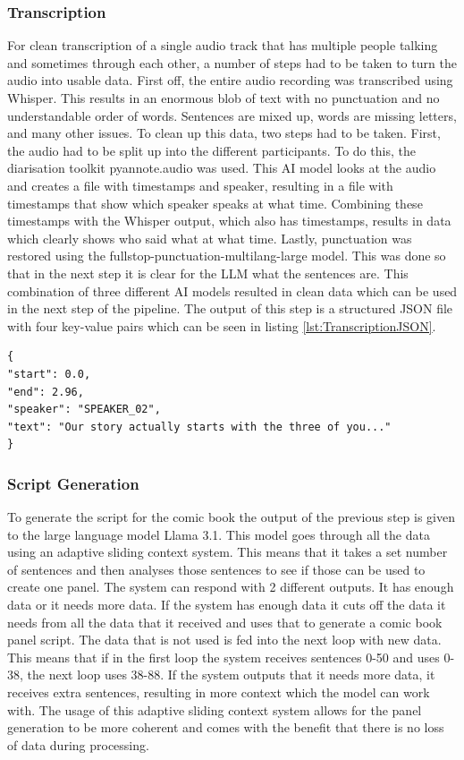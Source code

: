 \subsubsection*{Transcription}
For clean transcription of a single audio track that has multiple people talking and sometimes through each other, a number of steps had to be taken to turn the audio into usable data. First off, the entire audio recording was transcribed using Whisper. This results in an enormous blob of text with no punctuation and no understandable order of words. Sentences are mixed up, words are missing letters, and many other issues. To clean up this data, two steps had to be taken. First, the audio had to be split up into the different participants. To do this, the diarisation toolkit pyannote.audio was used. This AI model looks at the audio and creates a file with timestamps and speaker, resulting in a file with timestamps that show which speaker speaks at what time. Combining these timestamps with the Whisper output, which also has timestamps, results in data which clearly shows who said what at what time. Lastly, punctuation was restored using the fullstop-punctuation-multilang-large model. This was done so that in the next step it is clear for the LLM what the sentences are. This combination of three different AI models resulted in clean data which can be used in the next step of the pipeline. The output of this step is a structured JSON file with four key-value pairs which can be seen in listing \ref{lst:TranscriptionJSON}.

\begin{lstlisting}[style=jsonstyle, caption={Prompt for Comic Book Script Generation}, label={lst:TranscriptionJSON}]
{
"start": 0.0,
"end": 2.96,
"speaker": "SPEAKER_02",
"text": "Our story actually starts with the three of you..."
}
\end{lstlisting}
\subsubsection*{Script Generation}
To generate the script for the comic book the output of the previous step is given to the large language model Llama 3.1. This model goes through all the data using an adaptive sliding context system. This means that it takes a set number of sentences and then analyses those sentences to see if those can be used to create one panel. The system can respond with 2 different outputs. It has enough data or it needs more data. If the system has enough data it cuts off the data it needs from all the data that it received and uses that to generate a comic book panel script. The data that is not used is fed into the next loop with new data. This means that if in the first loop the system receives sentences 0-50 and uses 0-38, the next loop uses 38-88. If the system outputs that it needs more data, it receives extra sentences, resulting in more context which the model can work with. The usage of this adaptive sliding context system allows for the panel generation to be more coherent and comes with the benefit that there is no loss of data during processing. 

